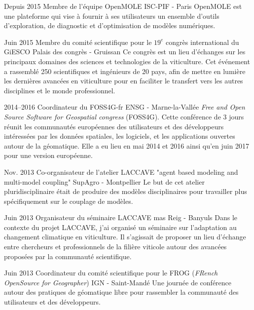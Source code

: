 \documentclass[]{cv-etienne}
\begin{document}
\begin{entrylist}
\entry
{Depuis 2015}
{Membre de l'équipe OpenMOLE}
{ISC-PIF - Paris}
{OpenMOLE est une plateforme qui vise à fournir à ses utilisateurs un ensemble d'outils d'exploration, de diagnostic et d'optimisation de modèles numériques.}
\end{entrylist}
\begin{entrylist}
\entry
{Juin 2015}
{Membre du comité scientifique pour le $19^{e}$ congrès international du GiESCO}
{Palais des congrès - Gruissan}
{Ce congrès est un lieu d'échanges sur les principaux domaines des sciences et technologies de la viticulture. Cet événement a rassemblé 250 scientifiques et ingénieurs de 20 pays, afin de mettre en lumière les dernières avancées en viticulture pour en faciliter le transfert vers les autres disciplines et le monde professionnel.}
\end{entrylist}
\begin{entrylist}
\entry
{2014--2016}
{Coordinateur du FOSS4G-fr}
{ENSG - Marne-la-Vallée}
{\emph{Free and Open Source Software for Geospatial congress} (FOSS4G). Cette conférence de 3 jours réunit les communautés européennes des utilisateurs et des développeurs intéressées par les données spatiales, les logiciels, et les applications ouvertes autour de la géomatique. Elle a eu lieu en mai 2014 et 2016 ainsi qu'en juin 2017 pour une version européenne.}
\end{entrylist}
\begin{entrylist}
\entry
{Nov. 2013}
{Co-organisateur de l'atelier LACCAVE "agent based modeling and  multi-model coupling"}
{SupAgro - Montpellier}
{Le but de cet atelier pluridisciplinaire était de produire des modèles disciplinaires pour travailler plus spécifiquement sur le couplage de modèles.}
\end{entrylist}
\begin{entrylist}
\entry
{Juin 2013}
{Organisateur du séminaire LACCAVE}
{mas Reig - Banyuls}
{Dans le contexte du projet LACCAVE, j'ai organisé un séminaire sur l'adaptation au changement climatique en viticulture. Il s'agissait de proposer un lieu d'échange entre chercheurs et professionnels de la filière viticole autour des avancées proposées par la communauté scientifique.}
\end{entrylist}
\begin{entrylist}
\entry
{Juin 2013}
{Coordinateur du comité scientifique pour le FROG  (\emph{FRench OpenSource for Geographer})}
{IGN - Saint-Mandé}
{Une journée de conférence autour des pratiques de géomatique libre pour rassembler la communauté des utilisateurs et des développeurs.}
\end{entrylist}
\end{document}
